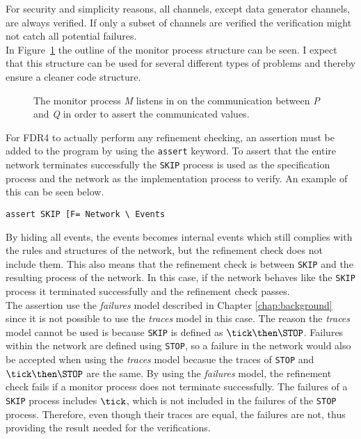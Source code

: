 For security and simplicity reasons, all channels, except data generator channels, are always verified. If only a subset of channels are verified the verification might not catch all potential failures.\\

In Figure~\ref{fig:assertion_process} the outline of the monitor process structure can be seen. I expect that this structure can be used for several different types of problems and thereby ensure a cleaner code structure.
\begin{figure}[!ht]
  \centering
  \caption{The monitor process \textit{M} listens in on the communication between \textit{P} and \textit{Q} in order to assert the communicated values.}
  \label{fig:assertion_process}
\end{figure}

For FDR4 to actually perform any refinement checking, an assertion must be added to the \cspm{} program by using the \texttt{assert} keyword.
To assert that the entire network terminates successfully the \texttt{SKIP} process is used as the specification process and the network as the implementation process to verify. An example of this can be seen below.
\begin{verbatim}
assert SKIP [F= Network \ Events
\end{verbatim}
By hiding all events, the events becomes internal events which still complies with the rules and structures of the network, but the refinement check does not include them. This also means that the refinement check is between \texttt{SKIP} and the resulting process of the network. In this case, if the network behaves like the \texttt{SKIP} process it terminated successfully and the refinement check passes.\\

The assertion use the \textit{failures} model described in Chapter \ref{chap:background} since it is not possible to use the \textit{traces} model in this case. The reason the \textit{traces} model cannot be used is because \texttt{SKIP} is defined as $\tick \then \STOP$. Failures within the network are defined using \texttt{STOP}, so a failure in the network would also be accepted when using the \textit{traces} model becasue the traces of \texttt{STOP} and $\tick \then \STOP$ are the same. By using the \textit{failures} model, the refinement check fails if a monitor process does not terminate successfully. The failures of a \texttt{SKIP} process includes $\tick$, which is not included in the failures of the \texttt{STOP} process. Therefore, even though their traces are equal, the failures are not, thus providing the result needed for the verifications.
